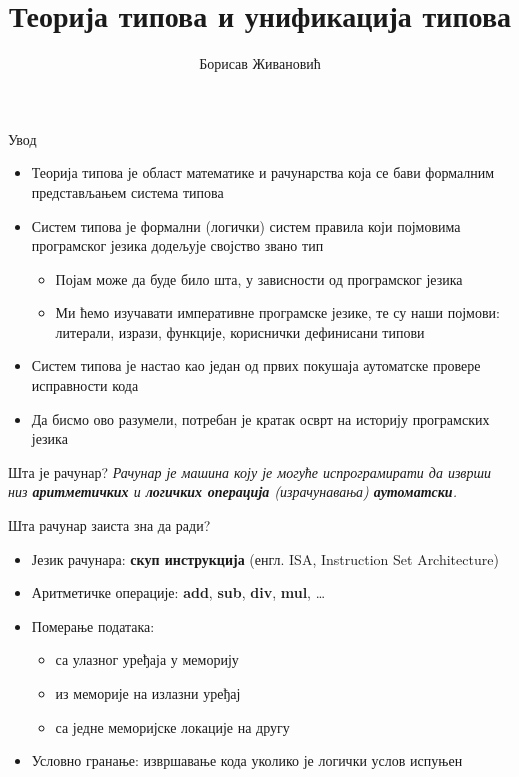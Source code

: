 \documentclass[xcolor=table]{beamer}
\title{Теорија типова и унификација типова}
\author{Борисав Живановић}
\date{}
\begin{document}
    \begin{frame}
        \maketitle
    \end{frame}
    
    \begin{frame}{Увод}
        \begin{itemize}
            \item Теорија типова је област математике и рачунарства која се бави формалним представљањем система типова
            \item Систем типова је формални (логички) систем правила који појмовима програмског језика додељује својство звано тип
            \begin{itemize}
                \item Појам може да буде било шта, у зависности од програмског језика
                \item Ми ћемо изучавати императивне програмске језике, те су наши појмови: литерали, изрази, функције, кориснички дефинисани типови
            \end{itemize}
            \item Систем типова је настао као један од првих покушаја аутоматске провере исправности кода
            \item Да бисмо ово разумели, потребан је кратак осврт на историју програмских језика
        \end{itemize}
    \end{frame}

    \begin{frame}{Шта је рачунар?}
        \textit{Рачунар је машина коју је могуће испрограмирати да изврши низ \textbf{аритметичких} и \textbf{логичких операција} (израчунавања) \textbf{аутоматски}.}
    \end{frame}

    \begin{frame}{Шта рачунар заиста зна да ради?}
        \begin{itemize}
            \item Језик рачунара: \textbf{скуп инструкција} (енгл. ISA, Instruction Set Architecture)
            \item Аритметичке операције: \textbf{add}, \textbf{sub}, \textbf{div}, \textbf{mul}, …
            \item Померање података:
            \begin{itemize}
                \item са улазног уређаја у меморију
                \item из меморије на излазни уређај
                \item са једне меморијске локације на другу
            \end{itemize}
            \item Условно гранање: извршавање кода уколико је логички услов испуњен
        \end{itemize}
    \end{frame}
\end{document}
